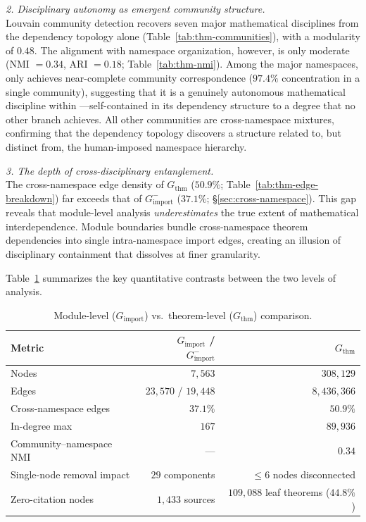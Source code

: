 \medskip
\noindent\textit{2. Disciplinary autonomy as emergent community structure.}\\
Louvain community detection recovers seven major mathematical disciplines from the dependency topology alone (Table~\ref{tab:thm-communities}), with a modularity of $0.48$. The alignment with namespace organization, however, is only moderate (NMI $= 0.34$, ARI $= 0.18$; Table~\ref{tab:thm-nmi}). Among the major namespaces, only  achieves near-complete community correspondence ($97.4\%$ concentration in a single community), suggesting that it is a genuinely autonomous mathematical discipline within ---self-contained in its dependency structure to a degree that no other branch achieves. All other communities are cross-namespace mixtures, confirming that the dependency topology discovers a structure related to, but distinct from, the human-imposed namespace hierarchy.

\medskip
\noindent\textit{3. The depth of cross-disciplinary entanglement.}\\
The cross-namespace edge density of $G_{\mathrm{thm}}$ ($50.9\%$; Table~\ref{tab:thm-edge-breakdown}) far exceeds that of $G_{\mathrm{import}}^{-}$ ($37.1\%$; \S\ref{sec:cross-namespace}). This gap reveals that module-level analysis \emph{underestimates} the true extent of mathematical interdependence. Module boundaries bundle cross-namespace theorem dependencies into single intra-namespace import edges, creating an illusion of disciplinary containment that dissolves at finer granularity.

\medskip

Table~\ref{tab:thm-vs-module} summarizes the key quantitative contrasts between the two levels of analysis.

\begin{table}[ht]
\centering
\caption{Module-level ($G_{\mathrm{import}}$) vs.\ theorem-level ($G_{\mathrm{thm}}$) comparison.}
\label{tab:thm-vs-module}
\begin{tabular}{lrr}
\toprule
Metric & $G_{\mathrm{import}}$ / $G_{\mathrm{import}}^{-}$ & $G_{\mathrm{thm}}$ \\
\midrule
Nodes                        & $7{,}563$          & $308{,}129$ \\
Edges                        & $23{,}570$ / $19{,}448$ & $8{,}436{,}366$ \\
Cross-namespace edges         & $37.1\%$           & $50.9\%$ \\
In-degree max                & $167$              & $89{,}936$ \\
Community--namespace NMI     & ---                & $0.34$ \\
Single-node removal impact   & $29$ components    & $\le 6$ nodes disconnected \\
Zero-citation nodes          & $1{,}433$ sources  & $109{,}088$ leaf theorems ($44.8\%$) \\
\bottomrule
\end{tabular}
\end{table}


